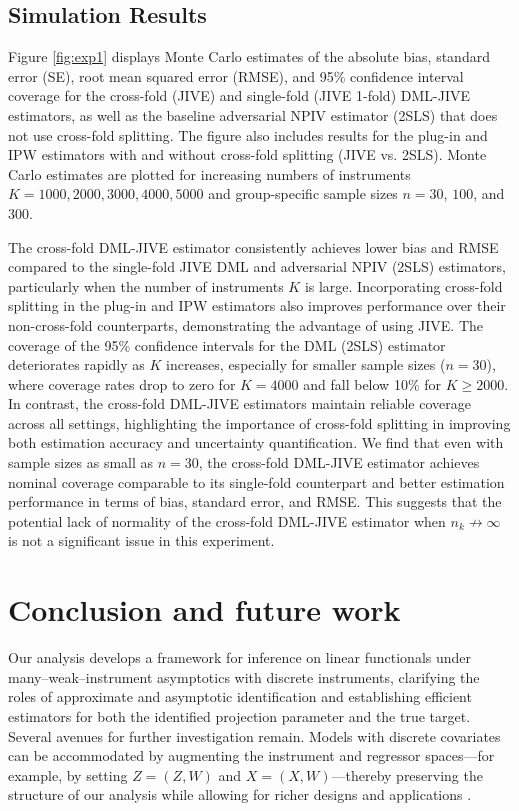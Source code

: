 \documentclass[11pt]{article}
\theoremstyle{plain}
\theoremstyle{definition}
\theoremstyle{remark}
\theoremstyle{definition}
\begin{document}
\subsection{Simulation Results}

Figure \ref{fig:exp1} displays Monte Carlo estimates of the absolute bias, standard error (SE), root mean squared error (RMSE), and 95\% confidence interval coverage for the cross-fold (JIVE) and single-fold (JIVE 1-fold) DML-JIVE estimators, as well as the baseline adversarial NPIV estimator (2SLS) that does not use cross-fold splitting. The figure also includes results for the plug-in and IPW estimators with and without cross-fold splitting (JIVE vs. 2SLS). Monte Carlo estimates are plotted for increasing numbers of instruments \( K = 1000, 2000, 3000, 4000, 5000 \) and group-specific sample sizes \( n = 30 \), \( 100 \), and \( 300 \).

The cross-fold  DML-JIVE estimator consistently achieves lower bias and RMSE compared to the single-fold JIVE DML and adversarial NPIV (2SLS) estimators, particularly when the number of instruments \( K \) is large. Incorporating cross-fold splitting in the plug-in and IPW estimators also improves performance over their non-cross-fold counterparts, demonstrating the advantage of using JIVE. The coverage of the 95\% confidence intervals for the DML (2SLS) estimator deteriorates rapidly as \( K \) increases, especially for smaller sample sizes (\( n = 30 \)), where coverage rates drop to zero for \( K = 4000 \) and fall below 10\% for \( K \geq 2000 \). In contrast, the cross-fold DML-JIVE estimators maintain reliable coverage across all settings, highlighting the importance of cross-fold splitting in improving both estimation accuracy and uncertainty quantification. We find that even with sample sizes as small as \( n = 30 \), the cross-fold DML-JIVE estimator achieves nominal coverage comparable to its single-fold counterpart and better estimation performance in terms of bias, standard error, and RMSE. This suggests that the potential lack of normality of the cross-fold DML-JIVE estimator when \( n_k \not \rightarrow \infty \) is not a significant issue in this experiment.
\section{Conclusion and future work}

Our analysis develops a framework for inference on linear functionals under
many--weak--instrument asymptotics with discrete instruments, clarifying the
roles of approximate and asymptotic identification and establishing efficient
estimators for both the identified projection parameter and the true target.
Several avenues for further investigation remain. Models with discrete
covariates can be accommodated by augmenting the instrument and regressor
spaces---for example, by setting $Z=(Z,W)$ and $X=(X,W)$---thereby preserving the
structure of our analysis while allowing for richer designs and applications
\citep{newey2003instrumental}.
\end{document}
